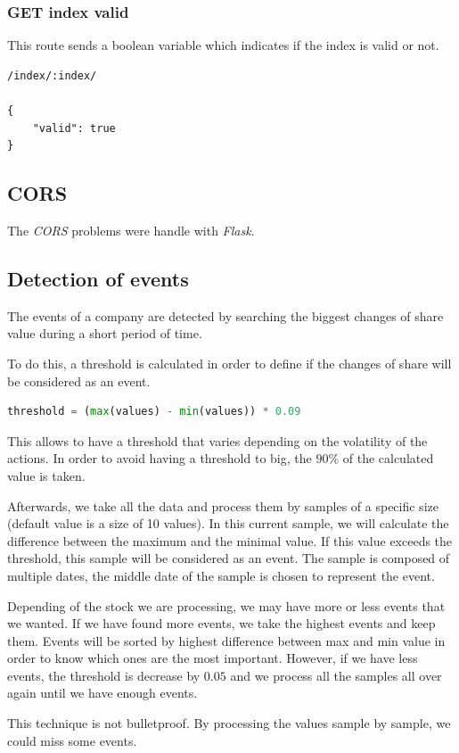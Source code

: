 \subsubsection*{GET index valid}
This route sends a boolean variable which indicates if the index is valid or not.
\begin{verbatim}
/index/:index/

{
    "valid": true
}
\end{verbatim}
\subsection{CORS}

The \textit{CORS} problems were handle with \textit{Flask}.

\subsection{Detection of events}

The events of a company are detected by searching the biggest changes of share value during a short period of time.

To do this, a threshold is calculated in order to define if the changes of share will be considered as an event.

\begin{lstlisting}[language=python, belowskip=-1.0 \baselineskip]
    threshold = (max(values) - min(values)) * 0.09
\end{lstlisting}

This allows to have a threshold that varies depending on the volatility of the actions. In order to avoid having a threshold to big, the $90\%$ of the calculated value is taken.

Afterwards, we take all the data and process them by samples of a specific size (default value is a size of 10 values). In this current sample, we will calculate the difference between the maximum and the minimal value. If this value exceeds the threshold, this sample will be considered as an event. The sample is composed of multiple dates, the middle date of the sample is chosen to represent the event.

Depending of the stock we are processing, we may have more or less events that we wanted. If we have found more events, we take the highest events and keep them. Events will be sorted by highest difference between max and min value in order to know which ones are the most important. However, if we have less events, the threshold is decrease by $0.05$ and we process all the samples all over again until we have enough events.

This technique is not bulletproof. By processing the values sample by sample, we could miss some events.







